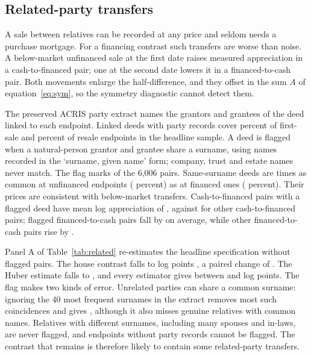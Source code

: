 \documentclass[12pt]{article}
\begin{document}
\subsection{Related-party transfers}
A sale between relatives can be recorded at any price and seldom needs a purchase mortgage. For a financing contrast such transfers are worse than noise. A below-market unfinanced sale at the first date raises measured appreciation in a cash-to-financed pair; one at the second date lowers it in a financed-to-cash pair. Both movements enlarge the half-difference, and they offset in the sum $A$ of equation~\eqref{eq:sym}, so the symmetry diagnostic cannot detect them.

The preserved ACRIS party extract names the grantors and grantees of the deed linked to each endpoint. Linked deeds with party records cover \PartyShareA{} percent of first-sale and \PartyShareZ{} percent of resale endpoints in the headline sample. A deed is flagged when a natural-person grantor and grantee share a surname, using names recorded in the `surname, given name' form; company, trust and estate names never match. The flag marks \RelPairs{} of the 6,006 pairs. Same-surname deeds are \RelRatio{} times as common at unfinanced endpoints (\RelShareCash{} percent) as at financed ones (\RelShareFin{} percent). Their prices are consistent with below-market transfers. Cash-to-financed pairs with a flagged deed have mean log appreciation of \RelGrowthCFRel{}, against \RelGrowthCFUnrel{} for other cash-to-financed pairs; flagged financed-to-cash pairs fall by \RelGrowthFCRel{} on average, while other financed-to-cash pairs rise by \RelGrowthFCUnrel{}.

Panel A of Table~\ref{tab:related} re-estimates the headline specification without flagged pairs. The house contrast falls to \NoRelOLS{} log points \NoRelOLSCI{}, a paired change of \NoRelChange{} \NoRelChangeCI{}. The Huber estimate falls to \NoRelHuber{} \NoRelHuberCI{}, and every estimator gives between \NoRelMin{} and \NoRelOLS{} log points. The flag makes two kinds of error. Unrelated parties can share a common surname: ignoring the 40 most frequent surnames in the extract removes most such coincidences and gives \NoRelStrictOLS{} \NoRelStrictOLSCI{}, although it also misses genuine relatives with common names. Relatives with different surnames, including many spouses and in-laws, are never flagged, and endpoints without party records cannot be flagged. The contrast that remains is therefore likely to contain some related-party transfers.
\end{document}
